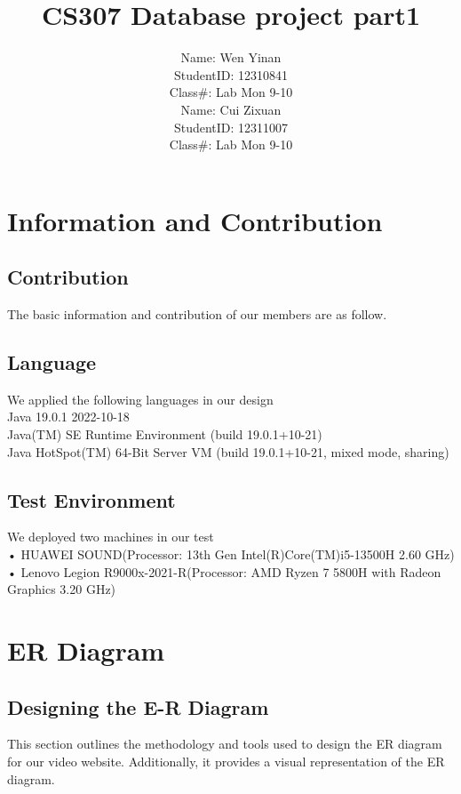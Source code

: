 \documentclass{article}
\title{CS307 Database project part1}
\author{Name: Wen Yinan\\
StudentID: 12310841\\
\vspace{1em} %
Class#: Lab Mon 9-10\\
Name: Cui Zixuan\\
StudentID: 12311007\\
Class#: Lab Mon 9-10
}
\begin{document}
\doublespacing
\maketitle
\newpage
\tableofcontents

\section{Information and Contribution}
\subsection{Contribution}

The basic information and contribution of our members are as follow.

\subsection{Language}

We applied the following languages in our design\\
    Java 19.0.1 2022-10-18\\
    Java(TM) SE Runtime Environment (build 19.0.1+10-21)\\
    Java HotSpot(TM) 64-Bit Server VM (build 19.0.1+10-21, mixed mode, sharing)\\

 \subsection{Test Environment}
We deployed two machines in our test\\
• HUAWEI SOUND(Processor: 13th Gen Intel(R)Core(TM)i5-13500H 2.60 GHz)\\
 • Lenovo Legion R9000x-2021-R(Processor: AMD Ryzen 7 5800H with Radeon Graphics            3.20 GHz)
\section{ER Diagram}
\subsection{Designing the E-R Diagram}
 This section outlines the methodology and tools used to design the ER diagram
 for our video website. Additionally, it provides a visual representation of the
 ER diagram.
\end{document}
